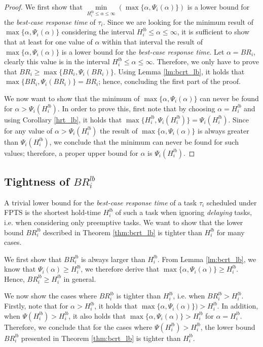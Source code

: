 \documentclass[fleqn]{article}
\begin{document}
\begin{proof}
	We first show that $\min \limits_{H_i^{lb} \leq \alpha \leq \infty} (\max \{ \alpha, \Psi_i(\alpha) \})$ is a lower bound for the \textit{best-case response time} of $\tau_i$. Since we are looking for the minimum result of $\max \{ \alpha, \Psi_i(\alpha)\}$ considering the interval $H_i^{lb} \leq \alpha \leq \infty$, it is sufficient to show that at least for one value of $\alpha$ within that interval the result of $\max \{ \alpha, \Psi_i(\alpha)\}$ is a lower bound for the \textit{best-case response time}. Let $\alpha = BR_i$, clearly this value is in the interval $H_i^{lb} \leq \alpha \leq \infty$. Therefore, we only have to prove that $BR_i \geq \max\{BR_i, \Psi_i(BR_i)\}$. Using Lemma \ref{lm:bcrt_lb}, it holds that $\max\{BR_i, \Psi_i(BR_i)\}=BR_i$; hence, concluding the first part of the proof.
	
	We now want to show that the minimum of $\max \{ \alpha, \Psi_i(\alpha)\}$ can never be found for $\alpha > \Psi_i(H^{lb}_i)$. In order to prove this, first note that by choosing $\alpha = H_i^{lb}$ and using Corollary \ref{hrt_lb}, it holds that $\max\{H^{lb}_i, \Psi_i(H^{lb}_i)\}=\Psi_i(H^{lb}_i)$. Since for any value of $\alpha > \Psi_i(H^{lb}_i)$ the result of $\max \{ \alpha, \Psi_i(\alpha)\}$ is always greater than $\Psi_i(H^{lb}_i)$, we conclude that the minimum can never be found for such values; therefore, a proper upper bound for $\alpha$ is $\Psi_i(H^{lb}_i)$.
\end{proof}

\subsection{Tightness of $BR^{lb}_i$}
A trivial lower bound for the \textit{best-case response time} of a task $\tau_i$ scheduled under FPTS is the shortest hold-time $H^{lb}_i$ of such a task when ignoring \textit{delaying} tasks, i.e. when considering only preemptive tasks. We want to show that the lower bound $BR^{lb}_i$ described in Theorem \ref{thm:bcrt_lb} is tighter than $H^{lb}_i$ for many cases.

We first show that $BR^{lb}_i$ is always larger than $H^{lb}_i$. From Lemma \ref{lm:bcrt_lb}, we know that $\Psi_i(\alpha) \geq H^{lb}_i$, we therefore derive that $\max \{ \alpha, \Psi_i(\alpha) \} \geq  H^{lb}_i$. Hence, $BR^{lb}_i \geq H^{lb}_i$ in general.

We now show the cases where $BR^{lb}_i$ is tighter than $H^{lb}_i$, i.e. when $BR^{lb}_i > H^{lb}_i$. Firstly, note that for $\alpha >  H^{lb}_i$, it holds that $\max \{ \alpha, \Psi_i(\alpha) \}) >  H^{lb}_i$. In addition, when $\Psi(H^{lb}_i) > H^{lb}_i$, it also holds that $\max \{ \alpha, \Psi_i(\alpha) \} >  H^{lb}_i$ for $\alpha =  H^{lb}_i$. Therefore, we conclude that for the cases where $\Psi(H^{lb}_i) > H^{lb}_i$, the lower bound $BR^{lb}_i$ presented in Theorem \ref{thm:bcrt_lb} is tighter than $H^{lb}_i$.
\end{document}
